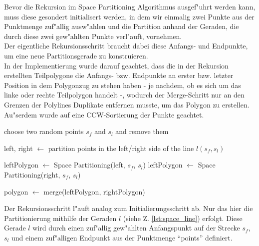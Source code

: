 \noindent
Bevor die Rekursion im Space Partitioning Algorithmus ausgef"uhrt werden
kann, muss diese gesondert initialisert werden, in dem wir einmalig zwei Punkte aus der
Punktmenge zuf"allig ausw"ahlen und die Partition anhand der Geraden, die durch diese
zwei gew"ahlten Punkte verl"auft, vornehmen. \\
Der eigentliche Rekursionsschritt braucht dabei diese Anfangs- und Endpunkte, um eine
neue Partitionsgerade zu konstruieren. \\
In der Implementierung wurde darauf geachtet, dass die in der Rekursion erstellten
Teilpolygone die Anfangs- bzw. Endpunkte an erster bzw. letzter Position in dem 
Polygonzug zu stehen haben - je nachdem, ob es sich um das linke oder rechte Teilpolygon
handelt -, wodurch der Merge-Schritt nur an den Grenzen der Polylines Duplikate entfernen
musste, um das Polygon zu erstellen.
Au"serdem wurde auf eine CCW-Sortierung der Punkte geachtet.



\begin{code}[caption={Space Partitioning}, mathescape=true]
choose two random points $s_f$ and $s_l$ and remove them

left, right $\leftarrow$ partition points in the left/right side of the line $l(s_f, s_l)$

leftPolygon $\leftarrow$ Space Partitioning(left, $s_f$, $s_l$)
leftPolygon $\leftarrow$ Space Partitioning(right, $s_f$, $s_l$)

polygon $\leftarrow$ merge(leftPolygon, rightPolygon)
\end{code}

\noindent

Der Rekursionsschritt l"auft analog zum Initialierungsschritt ab. Nur das hier
die Partitionierung mithilfe der Geraden $l$ (siehe Z. \ref{lst:space_line}) erfolgt.
Diese Gerade $l$ wird durch einen zuf"allig gew"ahlten Anfangspunkt auf der Strecke
$s_f$, $s_l$ und einem zuf"alligen Endpunkt aus der Punktmenge ``points'' definiert.

